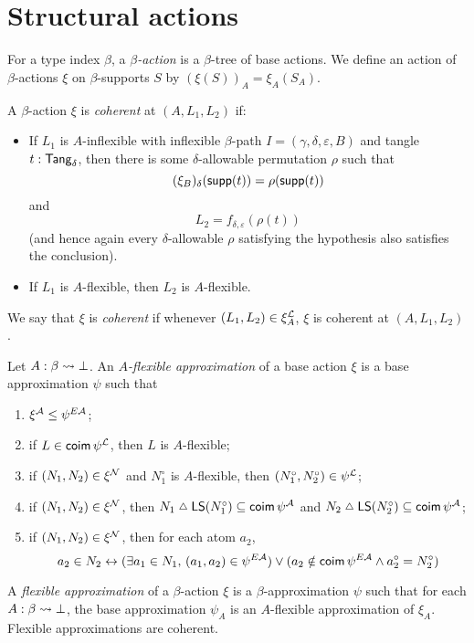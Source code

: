 \section{Structural actions}
\begin{definition}
  \label{def:StrAction}
  For a type index \( \beta \), a \emph{\( \beta \)-action} is a \( \beta \)-tree of base actions.
  We define an action of \( \beta \)-actions \( \xi \) on \( \beta \)-supports \( S \) by \( (\xi(S))_A = \xi_A(S_A) \).
\end{definition}
\begin{definition}
  \label{def:StrAction.Coherent}
  A \( \beta \)-action \( \xi \) is \emph{coherent} at \( (A, L_1, L_2) \) if:
  \begin{itemize}
    \item If \( L_1 \) is \( A \)-inflexible with inflexible \( \beta \)-path \( I = (\gamma, \delta, \varepsilon, B) \) and tangle \( t : \mathsf{Tang}_\delta \), then there is some \( \delta \)-allowable permutation \( \rho \) such that
    \[ (\xi_B)_\delta(\operatorname{\mathsf{supp}}(t)) = \rho(\operatorname{\mathsf{supp}}(t)) \]
    and
    \[ L_2 = f_{\delta,\varepsilon}(\rho(t)) \]
    (and hence again every \( \delta \)-allowable \( \rho \) satisfying the hypothesis also satisfies the conclusion).
    \item If \( L_1 \) is \( A \)-flexible, then \( L_2 \) is \( A \)-flexible.
  \end{itemize}
  We say that \( \xi \) is \emph{coherent} if whenever \( (L_1, L_2) \in \xi_A^{\mathcal L} \), \( \xi \) is coherent at \( (A, L_1, L_2) \).
\end{definition}
\begin{definition}
  \label{def:FlexApprox}
  Let \( A : \beta \rightsquigarrow \bot \).
  An \emph{\( A \)-flexible approximation} of a base action \( \xi \) is a base approximation \( \psi \) such that
  \begin{enumerate}
    \item \( \xi^{\mathcal A} \leq \psi^{E{\mathcal A}} \);
    \item if \( L \in \operatorname{\mathsf{coim}} \psi^{\mathcal L} \), then \( L \) is \( A \)-flexible;
    \item if \( (N_1, N_2) \in \xi^{\mathcal N} \) and \( N_1^\circ \) is \( A \)-flexible, then \( (N_1^\circ, N_2^\circ) \in \psi^{\mathcal L} \);
    \item if \( (N_1, N_2) \in \xi^{\mathcal N} \), then \( N_1 \symmdiff \LS(N_1^\circ) \subseteq \coim \psi^\Atom \) and \( N_2 \symmdiff \LS(N_2^\circ) \subseteq \coim \psi^\Atom \);
    \item if \( (N_1, N_2) \in \xi^{\mathcal N} \), then for each atom \( a_2 \),
    \[ a_2 \in N_2 \leftrightarrow (\exists a_1 \in N_1,\, (a_1, a_2) \in \psi^{E{\mathcal A}}) \vee (a_2 \notin \operatorname{\mathsf{coim}} \psi^{E{\mathcal A}} \wedge a_2^\circ = N_2^\circ) \]
  \end{enumerate}
  A \emph{flexible approximation} of a \( \beta \)-action \( \xi \) is a \( \beta \)-approximation \( \psi \) such that for each \( A : \beta \rightsquigarrow \bot \), the base approximation \( \psi_A \) is an \( A \)-flexible approximation of \( \xi_A \).
  Flexible approximations are coherent.
\end{definition}
